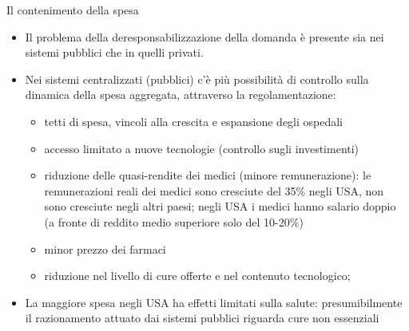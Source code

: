 \documentclass[aspectratio=64,11pt]{beamer}
\begin{document}
\begin{frame}{Il contenimento della spesa}
\begin{itemize}
\item Il problema della deresponsabilizzazione della domanda è presente
sia nei sistemi pubblici che in quelli privati.
\item Nei sistemi centralizzati (pubblici) c'è più possibilità di controllo sulla
dinamica della spesa aggregata, attraverso la regolamentazione:
\begin{itemize}
\item tetti di spesa, vincoli alla crescita e espansione degli ospedali
\item accesso limitato a nuove tecnologie (controllo sugli investimenti)
\item riduzione delle quasi-rendite dei medici (minore remunerazione):
le remunerazioni reali dei medici sono cresciute del 35\% negli USA,
non sono cresciute negli altri paesi; negli USA i medici hanno
salario doppio (a fronte di reddito medio superiore solo del 10-20\%)
\item minor prezzo dei farmaci
\item riduzione nel livello di cure offerte e nel contenuto
tecnologico;
\end{itemize}
\item La maggiore spesa negli USA ha effetti limitati sulla salute:
presumibilmente il razionamento attuato dai sistemi pubblici riguarda cure
non essenziali
\end{itemize}
\end{frame}
\end{document}
